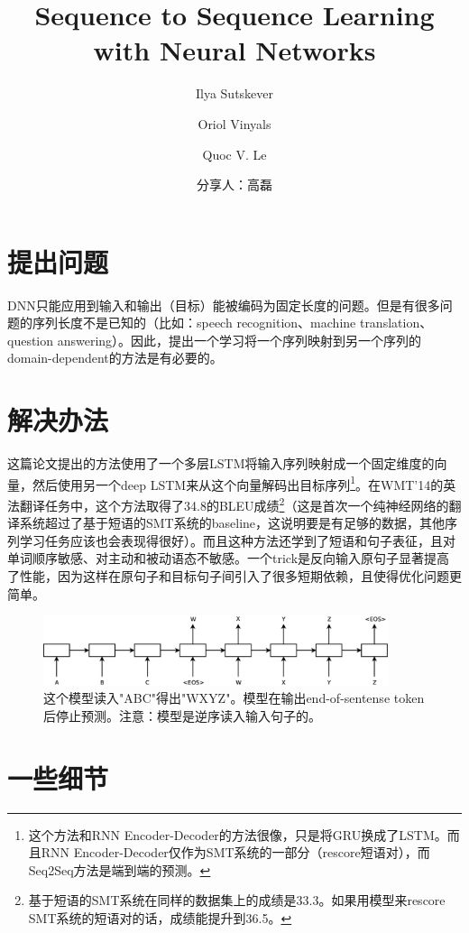 \documentclass[a4paper,UTF8,no-math]{ctexart}
\title{ Sequence to Sequence Learning with Neural Networks }
\author{
	Ilya Sutskever \\
	\and
	Oriol Vinyals \\
	\and
	Quoc V. Le \\
}
\date{分享人：高磊 \\ \zhtoday}
\begin{document}
	
	
	\maketitle


	\section{提出问题}
	
	DNN只能应用到输入和输出（目标）能被编码为固定长度的问题。但是有很多问题的序列长度不是已知的（比如：speech recognition、machine translation、question answering）。因此，提出一个学习将一个序列映射到另一个序列的domain-dependent的方法是有必要的。
	
	
	\section{解决办法}
	这篇论文提出的方法使用了一个多层LSTM将输入序列映射成一个固定维度的向量，然后使用另一个deep LSTM来从这个向量解码出目标序列\footnote{这个方法和RNN Encoder-Decoder的方法很像，只是将GRU换成了LSTM。而且RNN Encoder-Decoder仅作为SMT系统的一部分（rescore短语对），而Seq2Seq方法是端到端的预测。}。在WMT'14的英法翻译任务中，这个方法取得了34.8的BLEU成绩\footnote{基于短语的SMT系统在同样的数据集上的成绩是33.3。如果用模型来rescore SMT系统的短语对的话，成绩能提升到36.5。}（这是首次一个纯神经网络的翻译系统超过了基于短语的SMT系统的baseline，这说明要是有足够的数据，其他序列学习任务应该也会表现得很好）。而且这种方法还学到了短语和句子表征，且对单词顺序敏感、对主动和被动语态不敏感。一个trick是反向输入原句子显著提高了性能，因为这样在原句子和目标句子间引入了很多短期依赖，且使得优化问题更简单。
	
	\begin{figure}[h]
		\centering \includegraphics[width=0.9\textwidth]{./images/seq2seq/Diagram1.eps}
		\caption{\small 这个模型读入"ABC"得出"WXYZ"。模型在输出end-of-sentense token后停止预测。注意：模型是逆序读入输入句子的。}
		\label{fig:translation-model2}
	\end{figure}
	
	\section{一些细节}
	
\end{document}
